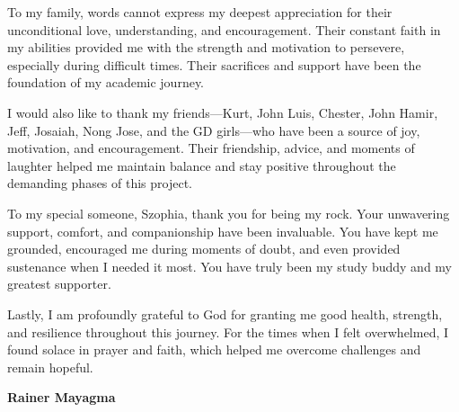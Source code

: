To my family, words cannot express my deepest appreciation for their unconditional love, understanding, and encouragement. Their constant faith in my abilities provided me with the strength and motivation to persevere, especially during difficult times. Their sacrifices and support have been the foundation of my academic journey.

I would also like to thank my friends—Kurt, John Luis, Chester, John Hamir, Jeff, Josaiah, Nong Jose, and the GD girls—who have been a source of joy, motivation, and encouragement. Their friendship, advice, and moments of laughter helped me maintain balance and stay positive throughout the demanding phases of this project.

To my special someone, Szophia, thank you for being my rock. Your unwavering support, comfort, and companionship have been invaluable. You have kept me grounded, encouraged me during moments of doubt, and even provided sustenance when I needed it most. You have truly been my study buddy and my greatest supporter.

Lastly, I am profoundly grateful to God for granting me good health, strength, and resilience throughout this journey. For the times when I felt overwhelmed, I found solace in prayer and faith, which helped me overcome challenges and remain hopeful.

\vspace{0.5em}
\hfill \textbf{Rainer Mayagma}